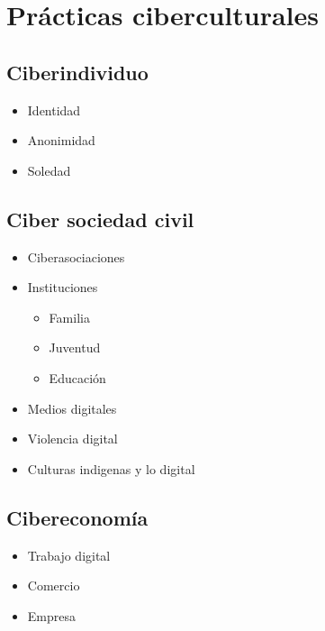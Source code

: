 \documentclass[]{book}
\providecommand{\tightlist}{%
  \setlength{\itemsep}{0pt}\setlength{\parskip}{0pt}}
\begin{document}
\hypertarget{pruxe1cticas-ciberculturales}{%
\chapter{Prácticas ciberculturales}\label{pruxe1cticas-ciberculturales}}

\hypertarget{ciberindividuo}{%
\section{Ciberindividuo}\label{ciberindividuo}}

\begin{itemize}
\tightlist
\item
  Identidad
\item
  Anonimidad
\item
  Soledad
\end{itemize}

\hypertarget{ciber-sociedad-civil}{%
\section{Ciber sociedad civil}\label{ciber-sociedad-civil}}

\begin{itemize}
\tightlist
\item
  Ciberasociaciones
\item
  Instituciones

  \begin{itemize}
  \tightlist
  \item
    Familia
  \item
    Juventud
  \item
    Educación
  \end{itemize}
\item
  Medios digitales
\item
  Violencia digital
\item
  Culturas indigenas y lo digital
\end{itemize}

\hypertarget{cibereconomuxeda}{%
\section{Cibereconomía}\label{cibereconomuxeda}}

\begin{itemize}
\tightlist
\item
  Trabajo digital
\item
  Comercio
\item
  Empresa
\end{itemize}
\end{document}
